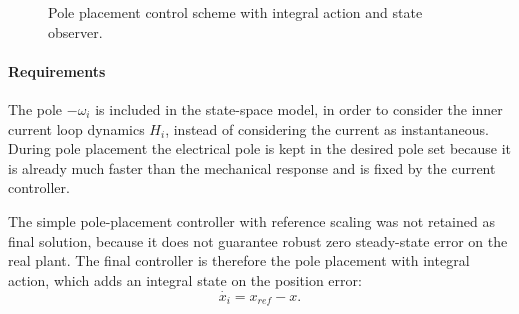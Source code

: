 \begin{figure}[H]
{
    }
    \caption{Pole placement control scheme with integral action and state observer.}
    \label{fig:pp_integral_observer_clean}
\end{figure}

\paragraph{Requirements}
The pole $-\omega_i$ is included in the state-space model, in order to consider the inner current loop dynamics $H_i$,
instead of considering the current as instantaneous.
During pole placement the electrical pole is kept in the desired pole set because it is already much
faster than the mechanical response and is fixed by the current controller.

The simple pole-placement controller with reference scaling was not retained as final solution,
because it does not guarantee robust zero steady-state error on the real plant. The final
controller is therefore the pole placement with integral action, which adds an integral state on the
position error:
\begin{equation}
    \dot{x_i} = x_{ref} - x.
\end{equation}

